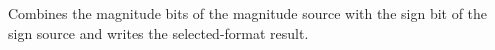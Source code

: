 Combines the magnitude bits of the magnitude source with the sign bit of the sign source and writes the selected-format result.
